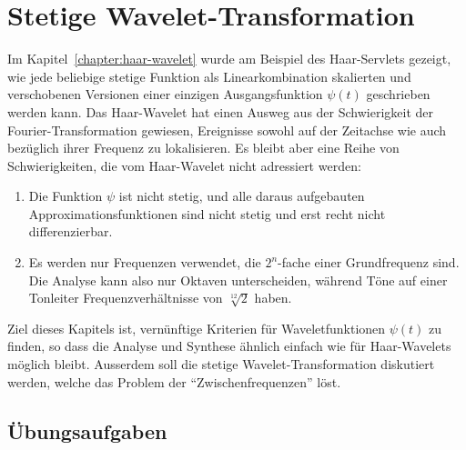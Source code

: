 %
%
%
\chapter{Stetige Wavelet-Transformation
\label{chapter:cwt}}
Im Kapitel~\ref{chapter:haar-wavelet} wurde am Beispiel des Haar-Servlets
gezeigt, wie jede beliebige stetige Funktion als Linearkombination 
skalierten und verschobenen Versionen einer einzigen Ausgangsfunktion
$\psi(t)$ geschrieben werden kann.
Das Haar-Wavelet hat einen Ausweg aus der Schwierigkeit der
Fourier-Transformation gewiesen, Ereignisse sowohl auf der Zeitachse
wie auch bezüglich ihrer Frequenz zu lokalisieren.
Es bleibt aber eine Reihe von Schwierigkeiten, die vom Haar-Wavelet nicht
adressiert werden:
\begin{enumerate}
\item
Die Funktion $\psi$ ist nicht stetig, und alle daraus aufgebauten
Approximationsfunktionen sind nicht stetig
und erst recht nicht differenzierbar.
\item
Es werden nur Frequenzen verwendet, die $2^n$-fache einer Grundfrequenz
sind.
Die Analyse kann also nur Oktaven unterscheiden, während
Töne auf einer Tonleiter Frequenzverhältnisse von $\sqrt[12]{2}$ haben.
\end{enumerate}
Ziel dieses Kapitels ist, vernünftige Kriterien für Waveletfunktionen
$\psi(t)$ zu finden, so dass die Analyse und Synthese ähnlich einfach
wie für Haar-Wavelets möglich bleibt.
Ausserdem soll die stetige Wavelet-Transformation diskutiert werden,
welche das Problem der ``Zwischenfrequenzen'' löst.






\section*{Übungsaufgaben}

